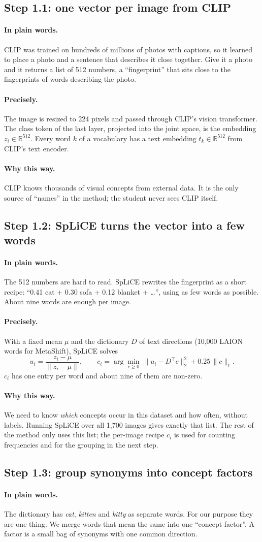 \documentclass[11pt]{article}
\newcommand{\plain}{\paragraph{In plain words.}}
\newcommand{\precise}{\paragraph{Precisely.}}
\newcommand{\why}{\paragraph{Why this way.}}
\begin{document}
\subsection{Step 1.1: one vector per image from CLIP}
\plain CLIP was trained on hundreds of millions of photos with captions, so it learned to place a photo and a
sentence that describes it close together. Give it a photo and it returns a list of 512 numbers, a ``fingerprint''
that sits close to the fingerprints of words describing the photo.

\precise The image is resized to 224 pixels and passed through CLIP's vision transformer. The class token of
the last layer, projected into the joint space, is the embedding $z_i\in\mathbb R^{512}$. Every word $k$ of a
vocabulary has a text embedding $t_k\in\mathbb R^{512}$ from CLIP's text encoder.

\why CLIP knows thousands of visual concepts from external data. It is the only source of ``names'' in the
method; the student never sees CLIP itself.

\subsection{Step 1.2: SpLiCE turns the vector into a few words}
\plain The 512 numbers are hard to read. SpLiCE rewrites the fingerprint as a short recipe: ``0.41 cat + 0.30
sofa + 0.12 blanket + \ldots'', using as few words as possible. About nine words are enough per image.

\precise With a fixed mean $\mu$ and the dictionary $D$ of text directions (10,000 LAION words for MetaShift),
SpLiCE solves \citep{bhalla2024splice}
\begin{equation}
u_i=\frac{z_i-\mu}{\lVert z_i-\mu\rVert},\qquad
c_i=\arg\min_{c\ge0}\ \lVert u_i-D^\top c\rVert_2^2+0.25\,\lVert c\rVert_1 .
\end{equation}
$c_i$ has one entry per word and about nine of them are non-zero.

\why We need to know \emph{which} concepts occur in this dataset and how often, without labels. Running SpLiCE
over all 1,700 images gives exactly that list. The rest of the method only uses this list; the per-image recipe
$c_i$ is used for counting frequencies and for the grouping in the next step.

\subsection{Step 1.3: group synonyms into concept factors}
\plain The dictionary has \emph{cat}, \emph{kitten} and \emph{kitty} as separate words. For our purpose they are one
thing. We merge words that mean the same into one ``concept factor''. A factor is a small bag of synonyms with one
common direction.
\end{document}
